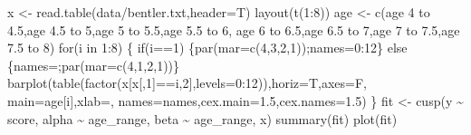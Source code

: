 \documentclass[
  a4paper,
  DIV=11,
  numbers=noendperiod,
  oneside]{scrreprt}
\newenvironment{Shaded}{}{}
\newcommand{\AttributeTok}[1]{\textcolor[rgb]{0.84,0.23,0.29}{#1}}
\newcommand{\ControlFlowTok}[1]{\textcolor[rgb]{0.84,0.23,0.29}{#1}}
\newcommand{\DecValTok}[1]{\textcolor[rgb]{0.00,0.36,0.77}{#1}}
\newcommand{\FloatTok}[1]{\textcolor[rgb]{0.00,0.36,0.77}{#1}}
\newcommand{\FunctionTok}[1]{\textcolor[rgb]{0.44,0.26,0.76}{#1}}
\newcommand{\NormalTok}[1]{\textcolor[rgb]{0.14,0.16,0.18}{#1}}
\newcommand{\OtherTok}[1]{\textcolor[rgb]{0.44,0.26,0.76}{#1}}
\newcommand{\SpecialCharTok}[1]{\textcolor[rgb]{0.00,0.36,0.77}{#1}}
\newcommand{\StringTok}[1]{\textcolor[rgb]{0.01,0.18,0.38}{#1}}
\begin{document}
\begin{Shaded}
\begin{Highlighting}[]
\NormalTok{x }\OtherTok{\textless{}{-}} \FunctionTok{read.table}\NormalTok{(}\StringTok{\textquotesingle{}data/bentler.txt\textquotesingle{}}\NormalTok{,}\AttributeTok{header=}\NormalTok{T)}
\FunctionTok{layout}\NormalTok{(}\FunctionTok{t}\NormalTok{(}\DecValTok{1}\SpecialCharTok{:}\DecValTok{8}\NormalTok{))}
\NormalTok{age }\OtherTok{\textless{}{-}} \FunctionTok{c}\NormalTok{(}\StringTok{\textquotesingle{}age 4 to 4.5\textquotesingle{}}\NormalTok{,}\StringTok{\textquotesingle{}age 4.5 to 5\textquotesingle{}}\NormalTok{,}\StringTok{\textquotesingle{}age 5 to 5.5\textquotesingle{}}\NormalTok{,}\StringTok{\textquotesingle{}age 5.5 to 6\textquotesingle{}}\NormalTok{,}
         \StringTok{\textquotesingle{}age 6 to 6.5\textquotesingle{}}\NormalTok{,}\StringTok{\textquotesingle{}age 6.5 to 7\textquotesingle{}}\NormalTok{,}\StringTok{\textquotesingle{}age 7 to 7.5\textquotesingle{}}\NormalTok{,}\StringTok{\textquotesingle{}age 7.5 to 8\textquotesingle{}}\NormalTok{)}
\ControlFlowTok{for}\NormalTok{(i }\ControlFlowTok{in} \DecValTok{1}\SpecialCharTok{:}\DecValTok{8}\NormalTok{)}
\NormalTok{\{}
  \ControlFlowTok{if}\NormalTok{(i}\SpecialCharTok{==}\DecValTok{1}\NormalTok{) \{}\FunctionTok{par}\NormalTok{(}\AttributeTok{mar=}\FunctionTok{c}\NormalTok{(}\DecValTok{4}\NormalTok{,}\DecValTok{3}\NormalTok{,}\DecValTok{2}\NormalTok{,}\DecValTok{1}\NormalTok{));names}\OtherTok{=}\DecValTok{0}\SpecialCharTok{:}\DecValTok{12}\NormalTok{\} }\ControlFlowTok{else} 
\NormalTok{    \{names}\OtherTok{=}\StringTok{\textquotesingle{}\textquotesingle{}}\NormalTok{;}\FunctionTok{par}\NormalTok{(}\AttributeTok{mar=}\FunctionTok{c}\NormalTok{(}\DecValTok{4}\NormalTok{,}\DecValTok{1}\NormalTok{,}\DecValTok{2}\NormalTok{,}\DecValTok{1}\NormalTok{))\}}
  \FunctionTok{barplot}\NormalTok{(}\FunctionTok{table}\NormalTok{(}\FunctionTok{factor}\NormalTok{(x[x[,}\DecValTok{1}\NormalTok{]}\SpecialCharTok{==}\NormalTok{i,}\DecValTok{2}\NormalTok{],}\AttributeTok{levels=}\DecValTok{0}\SpecialCharTok{:}\DecValTok{12}\NormalTok{)),}\AttributeTok{horiz=}\NormalTok{T,}\AttributeTok{axes=}\NormalTok{F,}
          \AttributeTok{main=}\NormalTok{age[i],}\AttributeTok{xlab=}\StringTok{\textquotesingle{}\textquotesingle{}}\NormalTok{,}
          \AttributeTok{names=}\NormalTok{names,}\AttributeTok{cex.main=}\FloatTok{1.5}\NormalTok{,}\AttributeTok{cex.names=}\FloatTok{1.5}\NormalTok{)}
\NormalTok{\}}
\NormalTok{fit }\OtherTok{\textless{}{-}} \FunctionTok{cusp}\NormalTok{(y }\SpecialCharTok{\textasciitilde{}}\NormalTok{ score, alpha }\SpecialCharTok{\textasciitilde{}}\NormalTok{ age\_range, beta }\SpecialCharTok{\textasciitilde{}}\NormalTok{ age\_range, x)}
\FunctionTok{summary}\NormalTok{(fit)}
\FunctionTok{plot}\NormalTok{(fit)}
\end{Highlighting}
\end{Shaded}
\end{document}
